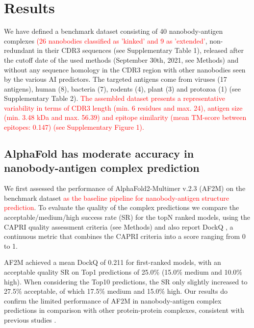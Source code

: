 \documentclass[12pt]{article}
\begin{document}
\section{Results}

We have defined a benchmark dataset consisting of 40 nanobody-antigen complexes \textcolor{Red}{(26 nanobodies classified as 'kinked' and 9 as 'extended'}, non-redundant in their CDR3 sequences (see Supplementary Table 1), released after the cutoff date of the used methods (September 30th, 2021, see Methods) and without any sequence homology in the CDR3 region with other nanobodies seen by the various AI predictors. The targeted antigens come from viruses (17 antigens), human (8), bacteria (7), rodents (4), plant (3) and protozoa (1) (see Supplementary Table 2). \textcolor{Red}{The assembled dataset presents a representative variability in terms of CDR3 length (min. 6 residues and max. 24), antigen size (min. 3.48 kDa and max. 56.39) and epitope similarity (mean TM-score between epitopes: 0.147) (see Supplementary Figure 1).}

\subsection{AlphaFold has moderate accuracy in nanobody-antigen complex prediction}

We first assessed the performance of AlphaFold2-Multimer v.2.3 (AF2M) on the benchmark dataset \textcolor{Red}{as the baseline pipeline for nanobody-antigen structure prediction}. To evaluate the quality of the complex predictions we compare the acceptable/medium/high success rate (SR) for the topN ranked models, using the CAPRI quality assessment criteria \cite{janin2003capri, mendez2003assessment} (see Methods) and also report DockQ \cite{basu2016dockq}, a continuous metric that combines the CAPRI criteria into a score ranging from 0 to 1.

AF2M achieved a mean DockQ of 0.211 for first-ranked models, with an acceptable quality SR on Top1 predictions of 25.0\% (15.0\% medium and 10.0\% high). When considering the Top10 predictions, the SR only slightly increased to 27.5\% acceptable, of which 17.5\% medium and 15.0\% high. Our results do confirm the limited performance of AF2M in nanobody-antigen complex predictions in comparison with other protein-protein complexes, consistent with previous studies \cite{yin2022benchmarking, wu2024fast}.
\end{document}
